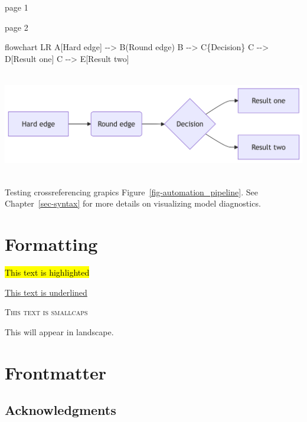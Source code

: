 \documentclass[
  11pt,
  letterpaper,
]{book}
\newenvironment{Shaded}{\begin{snugshade}}{\end{snugshade}}
\newcommand{\NormalTok}[1]{\textcolor[rgb]{0.00,0.23,0.31}{#1}}
\begin{document}
page 1

\newpage{}

page 2

\begin{Shaded}
\begin{Highlighting}[]
\NormalTok{flowchart LR}
\NormalTok{  A[Hard edge] {-}{-}\textgreater{} B(Round edge)}
\NormalTok{  B {-}{-}\textgreater{} C\{Decision\}}
\NormalTok{  C {-}{-}\textgreater{} D[Result one]}
\NormalTok{  C {-}{-}\textgreater{} E[Result two]}
\end{Highlighting}
\end{Shaded}

\includegraphics[width=6.88in,height=1.81in]{chapters/Frontmatter_files/figure-latex/mermaid-figure-1.png}

Testing crossreferencing grapics Figure~\ref{fig-automation_pipeline}.
See Chapter~\ref{sec-syntax} for more details on visualizing model
diagnostics.

\section{Formatting}\label{formatting}

\hl{This text is highlighted}

\ul{This text is underlined}

\textsc{This text is smallcaps}

\begin{landscape}

This will appear in landscape.

\end{landscape}

\section*{Frontmatter}\label{frontmatter}


\subsection{\texorpdfstring{\textbf{Acknowledgments}}{Acknowledgments}}\label{acknowledgments}
\end{document}
